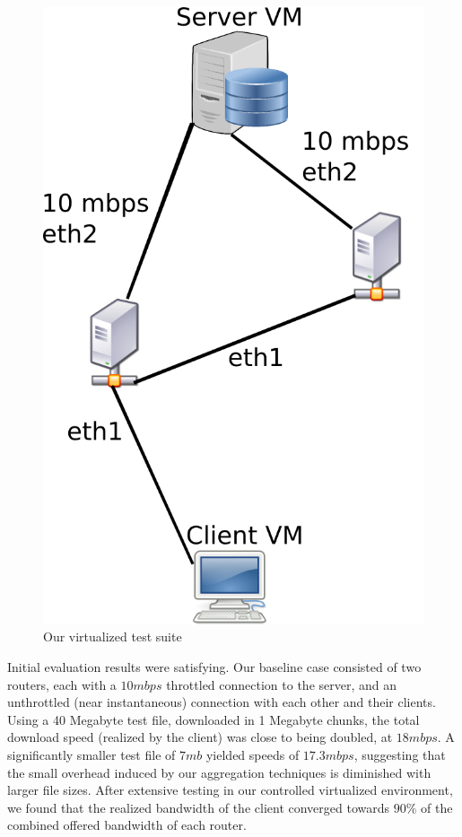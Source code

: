 \documentclass[12pt]{article}
\begin{document}
	\begin{figure}[H]
		\centering
		\includegraphics[keepaspectratio=true,scale=0.3]{InterfaceSetup.png}
		\caption{Our virtualized test suite}
		\label{fig:awesome_image}
	\end{figure}

	Initial evaluation results were satisfying. Our baseline case consisted of two routers, each with a $10 mbps$ throttled connection to the server, and an unthrottled (near instantaneous) connection with each other and their clients. Using a 40 Megabyte test file, downloaded in 1 Megabyte chunks, the total download speed (realized by the client) was close to being doubled, at $18 mbps$. A significantly smaller test file of $7 mb$ yielded speeds of $17.3 mbps$, suggesting that the small overhead induced by our aggregation techniques is diminished with larger file sizes. After extensive testing in our controlled virtualized environment, we found that the realized bandwidth of the client converged towards $90\%$ of the combined offered bandwidth of each router.
\end{document}
